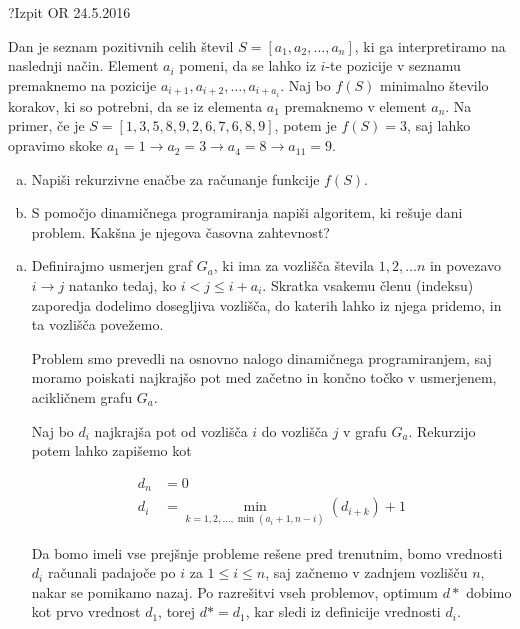 \begin{naloga}{?}{Izpit OR 24.5.2016}
\begin{vprasanje}
Dan je seznam pozitivnih celih števil $S = [a_1, a_2, \dots, a_n]$,
ki ga interpretiramo na naslednji način.
Element $a_i$ pomeni,
da se lahko iz $i$-te pozicije v seznamu
premaknemo na pozicije $a_{i+1}, a_{i+2}, \dots, a_{i+a_i}$.
Naj bo $f(S)$ minimalno število korakov,
ki so potrebni, da se iz elementa $a_1$ premaknemo v element $a_n$.
Na primer, če je $S = [1, 3, 5, 8, 9, 2, 6, 7, 6, 8, 9]$,
potem je $f(S) = 3$,
saj lahko opravimo skoke $a_1 = 1 \to a_2 = 3 \to a_4 = 8 \to a_{11} = 9$.

\begin{enumerate}[(a)]
\item Napiši rekurzivne enačbe za računanje funkcije $f(S)$.

\item S pomočjo dinamičnega programiranja napiši algoritem,
ki rešuje dani problem.
Kakšna je njegova časovna zahtevnost?
\end{enumerate}
\end{vprasanje}
\begin{odgovor}

\begin{enumerate}[a)]

\item Definirajmo usmerjen graf $G_a$, ki ima za vozlišča števila $1, 2, \dots n$ in povezavo $i \rightarrow j$ natanko tedaj, ko $i < j \leq i + a_i$.
Skratka vsakemu členu (indeksu) zaporedja dodelimo dosegljiva vozlišča, do katerih lahko iz njega  pridemo, in ta vozlišča povežemo.

Problem smo prevedli na osnovno nalogo dinamičnega programiranjem, saj moramo poiskati najkrajšo pot med začetno in končno točko v 
usmerjenem, acikličnem grafu $G_a$.

Naj bo $d_i$ najkrajša pot od vozlišča $i$ do vozlišča $j$ v grafu $G_a$. 
Rekurzijo potem lahko zapišemo kot

\begin{align*}
d_n &= 0 \\
d_i &= \min_{k = 1, 2, \dots, \min(a_i + 1, n - i)}(d_{i + k}) + 1
\end{align*}

Da bomo imeli vse prejšnje probleme rešene pred trenutnim, bomo vrednosti $d_i$ računali padajoče po $i$ za $1 \leq i \leq n$, 
saj začnemo v zadnjem vozlišču $n$, nakar se pomikamo nazaj.
Po razrešitvi vseh problemov, optimum $d*$ dobimo kot prvo vrednost $d_1$, torej $d* = d_1$, kar sledi iz definicije vrednosti $d_i$.


\end{enumerate}
\end{odgovor}
\end{naloga}
